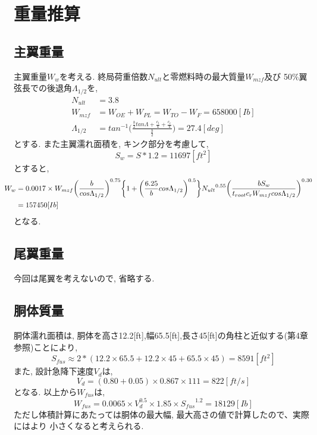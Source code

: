 \documentclass[class=article, crop=false, dvipdfmx, fleqn]{standalone}
\begin{document}
\section{重量推算}
\subsection{主翼重量}
主翼重量$W_w$を考える. 終局荷重倍数$N_{ult}$と零燃料時の最大質量$W_{mzf}$及び
50$\%$翼弦長での後退角$\Lambda_{1/2}$を,
\begin{align}
  N_{ult} &= 3.8 \\
  W_{mzf} &= W_{OE} + W_{PL} = W_{TO} - W_{F} = 658000 [Ib] \\
  \Lambda_{1/2} &= tan^{-1}
  \biggl( \frac{\frac{b}{2}tan\Lambda + \frac{c_t}{4} + \frac{c_r}{4}}{\frac{b}{2}} \biggr)
  = 27.4 [deg]
\end{align}
とする. また主翼濡れ面積を, キンク部分を考慮して,
\begin{equation}
  S_w = S * 1.2 = 11697 [ft^2]
\end{equation}
とすると,
\begin{align}
  \hspace{-5mm} W_w &= 0.0017 \times W_{mzf} {\biggl( \frac{b}{cos\Lambda_{1/2}} \biggr)}^{0.75}
  \biggl \{ 1 + {\biggl( \frac{6.25}{b}cos\Lambda_{1/2} \biggr)}^{0.5}\biggr \}
  {N_{ult}}^{0.55} { \biggl( \frac{bS_w}{t_{root}c_rW_{mzf}cos\Lambda_{1/2}}\biggr)}^{0.30} \\
  &= 157450 [Ib]
\end{align}
となる.

\subsection{尾翼重量}
今回は尾翼を考えないので, 省略する.

\subsection{胴体質量}
胴体濡れ面積は, 胴体を高さ12.2[ft],幅65.5[ft],長さ45[ft]の角柱と近似する(第4章参照)ことにより,
\begin{equation}
  S_{fus} \approx  2 * (12.2 \times 65.5  + 12.2 \times 45 + 65.5 \times 45)= 8591 [ft^2]
\end{equation}
また, 設計急降下速度$V_d$は,
\begin{equation}
  V_d = (0.80 + 0.05) \times 0.867 \times 111 = 822[ft/s]
\end{equation}
となる. 以上から$W_{fus}$は,
\begin{equation}
  W_{fus} = 0.0065 \times V_d^{0.5} \times 1.85 \times {S_{fus}}^{1.2}
  = 18129 [Ib]
\end{equation}
ただし体積計算にあたっては胴体の最大幅, 最大高さの値で計算したので、実際にはより
小さくなると考えられる.
\end{document}
